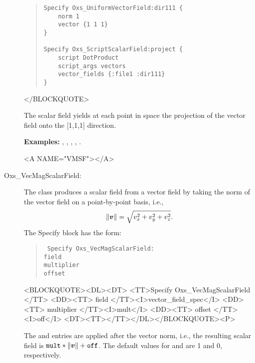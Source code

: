 \begin{description}
\begin{quote}
\begin{verbatim}
Specify Oxs_UniformVectorField:dir111 {
    norm 1
    vector {1 1 1}
}

Specify Oxs_ScriptScalarField:project {
    script DotProduct
    script_args vectors
    vector_fields {:file1 :dir111}
}\end{verbatim}
\end{quote}
\begin{rawhtml}</BLOCKQUOTE>\end{rawhtml}
The scalar field  yields at each point in space the
projection of the vector field  onto the [1,1,1] direction.

\textbf{Examples:} ,
, ,
, .

\begin{rawhtml}<A NAME="VMSF"></A>\end{rawhtml}%
%
\item[Oxs\_VecMagScalarField:]
The  class produces a scalar field
from a vector field by taking the norm of the vector field on a
point-by-point basis, i.e.,
\begin{displaymath}
   \|\mbox{\boldmath $v$}\| = \sqrt{v_x^2+v_y^2+v_z^2}.
\end{displaymath}
The Specify block has the form:
\begin{latexonly}
\begin{quote}\tt
Specify Oxs\_VecMagScalarField: \ocb\\
 \bi field \\
 \bi multiplier \\
 \bi offset \\
\ccb
\end{quote}
\end{latexonly}
\begin{rawhtml}<BLOCKQUOTE><DL><DT>
<TT>Specify Oxs_VecMagScalarField {</TT>
<DD><TT> field </TT><I>vector_field_spec</I>
<DD><TT> multiplier </TT><I>mult</I>
<DD><TT> offset </TT><I>off</I>
<DT><TT>}</TT></DL></BLOCKQUOTE><P>
\end{rawhtml}
The  and  entries are applied
after the vector norm, i.e., the resulting scalar field is
$\texttt{mult}\ast\|\mbox{\boldmath $v$}\|+\texttt{off}$.  The default values
for  and  are 1 and 0, respectively.


\end{description}
